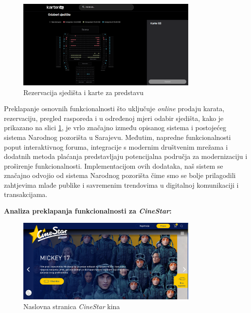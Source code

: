 \begin{figure}[htbp]
    \centering
    \includegraphics[width=0.8\textwidth]{Slike/narodnoPozoriste2.png}
    \caption{Rezervacija sjedišta i karte za predstavu}
    \label{fig:np2}
\end{figure}
Preklapanje osnovnih funkcionalnosti što uključuje \textit{online} prodaju karata, rezervaciju, pregled rasporeda i u određenoj mjeri odabir sjedišta, kako je prikazano na slici \ref{fig:np2}, je vrlo značajno između opisanog sistema i postojećeg sistema Narodnog pozorišta u Sarajevu. Međutim, napredne funkcionalnosti poput interaktivnog foruma, integracije s modernim društvenim mrežama i dodatnih metoda plaćanja predstavljaju potencijalna područja za modernizaciju i proširenje funkcionalnosti. Implementacijom ovih dodataka, naš sistem se značajno odvojio od sistema Narodnog pozorišta čime smo se bolje prilagodili zahtjevima mlađe publike i savremenim trendovima u digitalnoj komunikaciji i transakcijama.
\sloppy 

\newpage

\noindent\textbf{Analiza preklapanja funkcionalnosti za \textit{CineStar}:}
\begin{figure}[!htb]
    \centering
    \includegraphics[width=0.8\textwidth]{Slike/cinestar1.png}
    \caption{Naslovna stranica \textit{CineStar} kina}
    \label{fig:cs1}
\end{figure}

